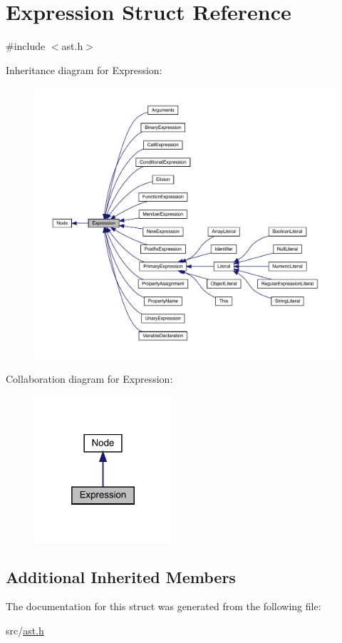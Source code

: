 \hypertarget{struct_expression}{}\section{Expression Struct Reference}
\label{struct_expression}


{\ttfamily \#include $<$ast.\+h$>$}



Inheritance diagram for Expression\+:
\nopagebreak
\begin{figure}[H]
\begin{center}
\leavevmode
\includegraphics[width=350pt]{struct_expression__inherit__graph}
\end{center}
\end{figure}


Collaboration diagram for Expression\+:
\nopagebreak
\begin{figure}[H]
\begin{center}
\leavevmode
\includegraphics[width=145pt]{struct_expression__coll__graph}
\end{center}
\end{figure}
\subsection*{Additional Inherited Members}


The documentation for this struct was generated from the following file\+:\begin{DoxyCompactItemize}
\item 
src/\hyperlink{ast_8h}{ast.\+h}\end{DoxyCompactItemize}
